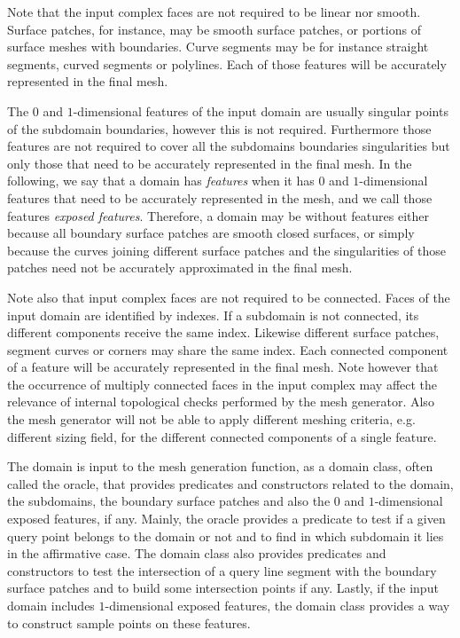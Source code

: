 Note that the input complex faces are not required to be linear nor smooth.
Surface patches, for instance, may be smooth surface patches, 
or portions of surface meshes with boundaries.
Curve segments may be  for instance straight segments, curved segments
or polylines. Each of those features will be accurately represented in the final mesh.



The $0$ and $1$-dimensional features of the input domain are usually singular  points
of the subdomain boundaries, however this is not required. Furthermore those features
are not required to cover all the subdomains  boundaries singularities
 but only those that need to be accurately represented in the final mesh.
In the following, we say that a domain has {\em features} when it has $0$ and
$1$-dimensional features that need to be accurately represented in the mesh,
and we call those features {\em exposed features}.
Therefore, a domain may be without features either because all boundary surface patches
are smooth closed surfaces, or simply because the curves  joining  different surface patches
and the singularities of those  patches need not be accurately approximated
in the final mesh.

Note also that input complex faces are not  required to be connected.
Faces of the input domain are identified by  indexes.
If a subdomain is not connected, its different components receive the same index.
Likewise different surface patches, segment curves or corners may share the same index.
Each connected component of a feature  will be accurately represented
in the final mesh.
Note however that the occurrence of multiply connected faces in the
input complex may affect the relevance of internal topological checks
performed by the mesh generator.  Also the mesh generator
will not be able to apply  different meshing criteria, e.g. different
sizing field, for the different connected components of a single feature. 

The domain is input to the mesh generation function,
as a domain class, often called  the  oracle,
that provides predicates and constructors related to the domain,
the subdomains, the boundary surface patches
and  also the $0$ and $1$-dimensional exposed features, if any.
Mainly, the oracle provides  a predicate to test
if  a given query point belongs 
to the domain or not
and  to find in which subdomain it lies in the affirmative case.
The domain class also provides predicates  and constructors to test the intersection of a query line segment
with the boundary  surface patches and to build some intersection points if any.
Lastly, if the input domain includes $1$-dimensional exposed features, the domain class
provides a way to construct sample points on these features.

